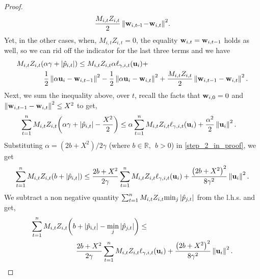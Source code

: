 \begin{proof}
\begin{equation*}
\begin{split}
\frac{M_{i,t}Z_{i,t}}{2}\left\Vert {\mathbf{w}_{i,t\!-\!1}\!-\!\mathbf{w}_{i,t}} \right\Vert^2\!.
\end{split}
\end{equation*} 
 Yet, in the other cases,  when,  $M_{i,t}Z_{i,t}=0$,
the equality $\mathbf{w}_{i,t}=\mathbf{w}_{i,t-1}$ holds as well, so we can rid off the indicator for the last three terms and we have
\begin{equation}
\begin{split}
M_{i,t}Z_{i,t}{\left({\alpha\gamma +\left\vert{\hat{p}_{i,t}}\right\vert}\right)} \le M_{i,t}&Z_{i,t}\alpha \ell_{\gamma,i,t}(\mathbf{u}_i)+\\ 
\frac{1}{2}\left\Vert {\alpha \mathbf{u}_i-\mathbf{w}_{i,t-1}} \right\Vert^2&-\frac{1}{2}\left\Vert {\alpha \mathbf{u}_i-\mathbf{w}_{i,t}} \right\Vert^2+
\frac{M_{i,t}Z_{i,t}}{2}\left\Vert {\mathbf{w}_{i,t-1}-\mathbf{w}_{i,t}} \right\Vert^2.
\end{split}
\end{equation}\label{step_1_in_proof} 
Next, we sum the inequality above, over $t$,  recall the facts that
$\mathbf{w}_{i,0}=0$ and $\left\Vert {\mathbf{w}_{i,t-1}-\mathbf{w}_{i,t}} \right\Vert^2\le X^2$ to get,
\begin{equation}
\begin{split}
\sum_{t=1}^{n}{M_{i,t}Z_{i,t}{\left({\alpha\gamma+\left\vert{\hat{p}_{i,t}}\right\vert-\frac{X^2}{2}}\right)}}
\le\alpha\sum_{t=1}^{n}{ M_{i,t}Z_{i,t}
  \ell_{\gamma,i,t}(\mathbf{u}_i)}&+\frac{\alpha^2}{2}\left\Vert {\mathbf{u}_i} \right\Vert^2.
\end{split}
\label{step_2_in_proof}
\end{equation}
Substituting $\alpha=(2b+X^2)/2\gamma$ (where $b\in\mathbb{R},~~b>0$)
in \eqref{step_2_in_proof}, we get
\begin{equation*}
\begin{split}
\sum_{t=1}^{n}{M_{i,t}Z_{i,t}{\left({b +\left\vert{\hat{p}_{i,t}}\right\vert}\right)}}
\le \frac{2b+X^2}{2\gamma}\sum_{t=1}^{n}{ M_{i,t}Z_{i,t}\ell_{\gamma,i,t}(\mathbf{u}_i)}
+\frac{\left({2b+X^2}\right)^2}{8{\gamma}^2}\left\Vert {\mathbf{u}_i} \right\Vert^2.
\end{split}
\end{equation*} 
We subtract a non negative quantity $\sum_{t=1}^{n}M_{i,t}Z_{i,t}
{{\min_j{\left\vert{\hat{p}_{j,t}}\right\vert}}}$ from the l.h.s. and get,
\begin{equation}
\begin{split}
\sum_{t=1}^{n}M_{i,t}Z_{i,t}{\left({b +\left\vert{\hat{p}_{i,t}}\right\vert-\min_j{\left\vert{\hat{p}_{j,t}}\right\vert}}\right)}&\le\\
\frac{2b+X^2}{2\gamma}\sum_{t=1}^{n}{ M_{i,t}Z_{i,t}}&\ell_{\gamma,i,t}(\mathbf{u}_i)
+\frac{\left({2b+X^2}\right)^2}{8{\gamma}^2}\left\Vert {\mathbf{u}_i} \right\Vert^2.
\label{step_2_in_proof}
\end{split}
\end{equation}

\end{proof}
